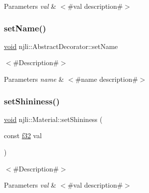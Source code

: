 \begin{DoxyParams}{Parameters}
{\em val} & $<$\#val description\#$>$ \\
\hline
\end{DoxyParams}
\mbox{\label{classnjli_1_1_material_a087eb5f8d9f51cc476f12f1d10a3cb95}} 
\subsubsection{\texorpdfstring{set\+Name()}{setName()}}
{\footnotesize\ttfamily \mbox{\hyperlink{_thread_8h_af1e856da2e658414cb2456cb6f7ebc66}{void}} njli\+::\+Abstract\+Decorator\+::set\+Name}

$<$\#\+Description\#$>$


\begin{DoxyParams}{Parameters}
{\em name} & $<$\#name description\#$>$ \\
\hline
\end{DoxyParams}
\mbox{\label{classnjli_1_1_material_a88b23a7dc24dae378fa6e345a8600e19}} 
\subsubsection{\texorpdfstring{set\+Shininess()}{setShininess()}}
{\footnotesize\ttfamily \mbox{\hyperlink{_thread_8h_af1e856da2e658414cb2456cb6f7ebc66}{void}} njli\+::\+Material\+::set\+Shininess (\begin{DoxyParamCaption}\item[{const \mbox{\hyperlink{_util_8h_a5f6906312a689f27d70e9d086649d3fd}{f32}}}]{val }\end{DoxyParamCaption})}

$<$\#\+Description\#$>$


\begin{DoxyParams}{Parameters}
{\em val} & $<$\#val description\#$>$ \\
\hline
\end{DoxyParams}
\mbox{\label{classnjli_1_1_material_a1082fa0725cabeb9b824d9ced36e2c69}} 
